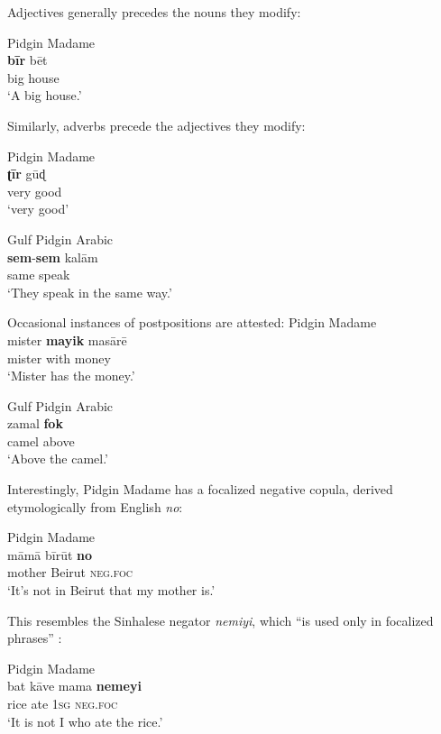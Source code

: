 \documentclass[output=paper]{langsci/langscibook}
\begin{document}
Adjectives generally precedes the nouns they modify:

\ea
{ Pidgin Madame \citep[119]{Bizri2010}}\\
\gll   \textbf{bī}\textbf{r} bēt\\
       big house\\
\glt     `A big house.'
\z

Similarly, adverbs precede the adjectives they modify:

\ea
\ea Pidgin Madame \citep[119]{Bizri2010}\\
\gll     \textbf{ʈīr} gūɖ\\
         very good\\
\glt       `very good'

\ex
Gulf Pidgin Arabic \citep[25]{Avram2014Pidgin}\\
\gll     \textbf{sem}-\textbf{sem} kalām\\
         same speak \\
\glt       `They speak in the same way.'
 \z
 \z

  Occasional instances of postpositions are attested:
\ea
\ea Pidgin Madame \citep[132]{Bizri2010}\\
\gll     mister \textbf{mayik} masārē\\
         mister with money\\
\glt    `Mister has the money.'

\ex
Gulf Pidgin Arabic \citep[25]{Avram2014Pidgin}\\
\gll     zamal \textbf{fok} \\
         camel above\\
\glt       `Above the camel.'
\z
\z

Interestingly, Pidgin Madame has a focalized negative copula, derived etymologically from English \textit{no}:

\ea
{ Pidgin Madame \citep[133]{Bizri2010}}\\
\gll   māmā bīrūt \textbf{no}\\
       mother Beirut \textsc{neg}.\textsc{foc}\\
\glt     `It’s not in Beirut that my mother is.'
\z

This resembles the Sinhalese negator \textit{nemiyi}, which “is used only in focalized phrases” \citep[69]{Bizri2010}:

\ea
{ Pidgin Madame \citep[69]{Bizri2010}}\\
\gll   bat kāve mama \textbf{nemeyi}\\
       rice ate 1\textsc{sg} \textsc{neg}.\textsc{foc}\\
\glt     `It is not I who ate the rice.'
\z
\end{document}
